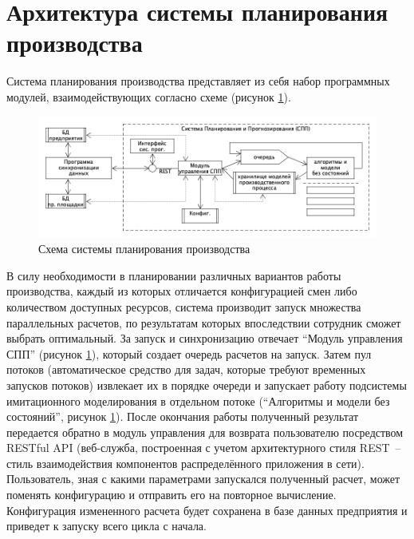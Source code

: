 \section{Архитектура системы планирования производства}
\indent Система планирования производства представляет из себя набор программных модулей, взаимодействующих согласно схеме (рисунок \ref{fig:archSPP}).

\begin{figure}[ht]
	\centering
	\includegraphics[width=\linewidth]{pics/archSPP.png}
	\caption{Схема системы планирования производства \cite{niorkpz}}
	\label{fig:archSPP}
\end{figure}

\indent В силу необходимости в планировании различных вариантов работы производства, каждый из которых отличается конфигурацией смен либо количеством доступных ресурсов, система производит запуск множества параллельных расчетов, по результатам которых впоследствии сотрудник сможет выбрать оптимальный.
За запуск и синхронизацию отвечает ``Модуль управления СПП'' (рисунок \ref{fig:archSPP}), который создает очередь расчетов на запуск.
Затем пул потоков (автоматическое средство для задач, которые требуют временных запусков потоков) извлекает их в порядке очереди и запускает работу подсистемы имитационного моделирования в отдельном потоке (``Алгоритмы и модели без состояний'', рисунок \ref{fig:archSPP}).
После окончания работы полученный результат передается обратно в модуль управления для возврата пользователю посредством RESTful API (веб-служба, построенная с учетом архитектурного стиля REST~--~ стиль взаимодействия компонентов распределённого приложения в сети).
Пользователь, зная с какими параметрами запускался полученный расчет, может поменять конфигурацию и отправить его на повторное вычисление.
Конфигурация измененного расчета будет сохранена в базе данных предприятия и приведет к запуску всего цикла с начала.